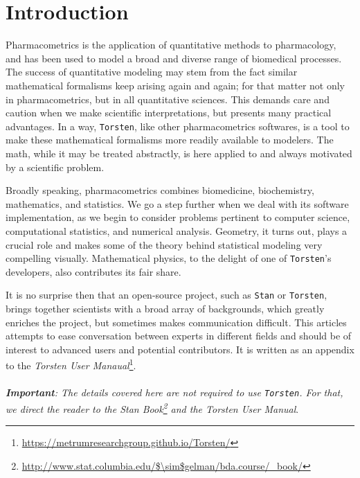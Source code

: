 \documentclass[11pt]{article}
\begin{document}
\section{Introduction}\label{introduction}

  Pharmacometrics is the application of quantitative methods to pharmacology,
  and has been used to model a broad and diverse range of biomedical 
  processes. The success of quantitative modeling may stem from the
  fact similar mathematical formalisms keep arising again and again; for
  that matter not only in pharmacometrics, but in all quantitative sciences.
  This demands care and caution when we make scientific interpretations, but
  presents many practical advantages. In a way, \texttt{Torsten},
  like other pharmacometrics 
  softwares, is a tool to make these mathematical formalisms more readily 
  available to modelers. The math, while it may be treated abstractly, is here applied
  to and always motivated by a scientific problem.

  Broadly speaking, pharmacometrics
  combines biomedicine, biochemistry, mathematics, and statistics. We
  go a step further when we deal with its software implementation,
  as we begin to consider problems pertinent
  to computer science, computational statistics, and numerical analysis. 
  Geometry, it turns out, plays a crucial role and makes some of the theory
  behind statistical modeling very compelling visually. Mathematical
  physics, to the delight of one of \texttt{Torsten}'s developers, also contributes
  its fair share.
  
  It is no surprise then that an open-source project, such as \texttt{Stan} or \texttt{Torsten}, 
  brings together scientists with a broad array of backgrounds, which greatly 
  enriches the project, but sometimes makes communication difficult. This 
  articles attempts to ease conversation between experts in different fields 
  and should be of interest to advanced users and potential contributors. 
  It is written as an appendix to the \textit{Torsten User 
  Manaual}\footnote{\url{https://metrumresearchgroup.github.io/Torsten/}}. \\ \\
  \textit{\textbf{Important}: The details covered here are not required to use \texttt{Torsten}.
  For that, we direct the reader to the \textit{Stan Book}\footnote{\url{http://www.stat.columbia.edu/$\sim$gelman/bda.course/\_book/}}
  and the \textit{Torsten User Manual}}. \\
  
\end{document}
